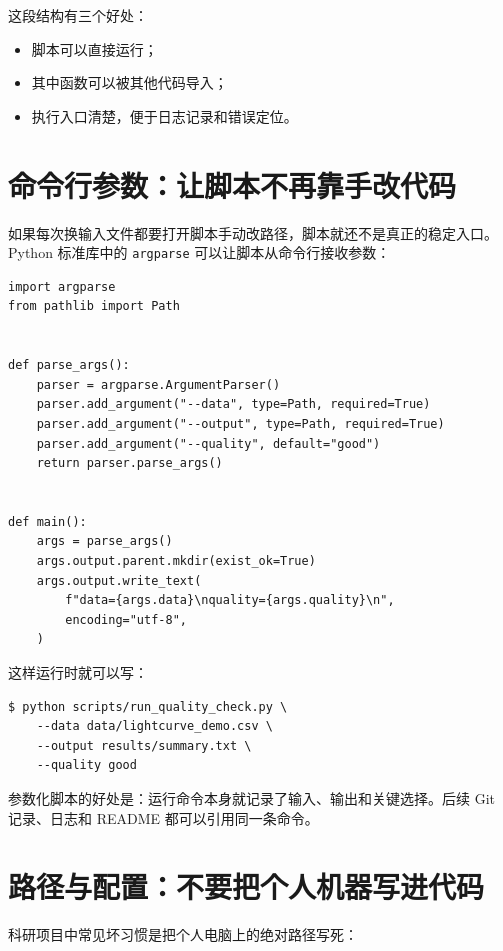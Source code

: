 这段结构有三个好处：

\begin{itemize}
    \item 脚本可以直接运行；
    \item 其中函数可以被其他代码导入；
    \item 执行入口清楚，便于日志记录和错误定位。
\end{itemize}

\section{命令行参数：让脚本不再靠手改代码}

如果每次换输入文件都要打开脚本手动改路径，脚本就还不是真正的稳定入口。Python 标准库中的 \texttt{argparse} 可以让脚本从命令行接收参数：

\begin{examplebox}[最小参数入口]
\begin{lstlisting}[style=pythonstyle]
import argparse
from pathlib import Path


def parse_args():
    parser = argparse.ArgumentParser()
    parser.add_argument("--data", type=Path, required=True)
    parser.add_argument("--output", type=Path, required=True)
    parser.add_argument("--quality", default="good")
    return parser.parse_args()


def main():
    args = parse_args()
    args.output.parent.mkdir(exist_ok=True)
    args.output.write_text(
        f"data={args.data}\nquality={args.quality}\n",
        encoding="utf-8",
    )
\end{lstlisting}
\end{examplebox}

这样运行时就可以写：

\begin{lstlisting}[style=terminal]
$ python scripts/run_quality_check.py \
    --data data/lightcurve_demo.csv \
    --output results/summary.txt \
    --quality good
\end{lstlisting}

参数化脚本的好处是：运行命令本身就记录了输入、输出和关键选择。后续 Git 记录、日志和 README 都可以引用同一条命令。

\section{路径与配置：不要把个人机器写进代码}

科研项目中常见坏习惯是把个人电脑上的绝对路径写死：

